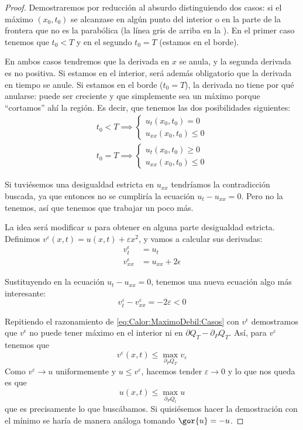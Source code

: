 	 \begin{proof}
		Demostraremos por reducción al absurdo distinguiendo dos casos: si el máximo $(x_0, t_0)$ se alcanzase en algún punto del interior o en la parte de la frontera que no es la parabólica (la línea gris de arriba en la ). En el primer caso tenemos que $t_0 < T$ y en el segundo $t_0 = T$ (estamos en el borde).

		En ambos casos tendremos que la derivada en $x$ se anula, y la segunda derivada es no positiva. Si estamos en el interior, será además obligatorio que la derivada en tiempo se anule. Si estamos en el borde ($t_0 = T$), la derivada no tiene por qué anularse: puede ser creciente y que simplemente sea un máximo porque ``cortamos'' ahí la región.  Es decir, que tenemos las dos posibilidades siguientes:
		\begin{gather}
		t_0 < T \implies \begin{cases} u_t(x_0, t_0) = 0 \\ u_{xx} (x_0, t_0) ≤ 0 \end{cases}
		\nonumber \\
		t_0 = T \implies \begin{cases} u_t(x_0, t_0) ≥ 0 \\ u_{xx} (x_0, t_0) ≤ 0 \end{cases}
		\label{eq:Calor:MaximoDebil:Casos}
		\end{gather}

		Si tuviésemos una desigualdad estricta en $u_{xx}$ tendríamos la contradicción buscada, ya que entonces no se cumpliría la ecuación $u_{t} - u_{xx} = 0$. Pero no la tenemos, así que tenemos que trabajar un poco más.

		La idea será modificar $u$ para obtener en alguna parte desigualdad estricta. Definimos $v^ε(x,t) = u(x,t) + εx^2$, y vamos a calcular sus derivadas:
		\begin{align*}
			v^\epsilon_t &= u_t \\
			v^\epsilon_{xx} &= u_{xx} + 2\epsilon
		\end{align*}

		Sustituyendo en la ecuación $u_{t} - u_{xx} = 0$, tenemos una nueva ecuación algo más interesante: \[ v^ε_t - v^ε_{xx} = -2ε < 0 \]

		Repitiendo el razonamiento de \eqref{eq:Calor:MaximoDebil:Casos} con $v^\epsilon$ demostramos que $v^\epsilon$ no puede tener máximo en el interior ni en $\partial Q_T - \partial_P Q_T$. Así, para $v^ε$ tenemos que $$ v^ε(x,t) ≤ \max_{∂_PQ_T} v_ε $$
		Como $v^ε \to u$ uniformemente y $u ≤ v^ε$, hacemos tender $ε \to 0$ y lo que nos queda es que \[ u(x,t) ≤ \max_{∂_PQ_t} u \] que es precisamente lo que buscábamos. Si quisiésemos hacer la demostración con el mínimo se haría de manera análoga tomando $\gor{u} = - u$.
	 \end{proof}

